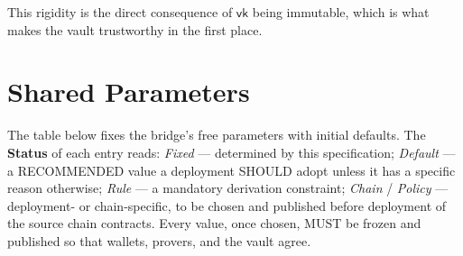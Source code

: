 This rigidity is the direct consequence of $\mathsf{vk}$ being immutable, which is what makes the vault trustworthy in the first place.

\section{Shared Parameters}\label{app:bridging-params}

The table below fixes the bridge's free parameters with initial defaults. The \textbf{Status} of each entry reads: \emph{Fixed} --- determined by this specification; \emph{Default} --- a RECOMMENDED value a deployment SHOULD adopt unless it has a specific reason otherwise; \emph{Rule} --- a mandatory derivation constraint; \emph{Chain} / \emph{Policy} --- deployment- or chain-specific, to be chosen and published before deployment of the source chain contracts. Every value, once chosen, MUST be frozen and published so that wallets, provers, and the vault agree.

